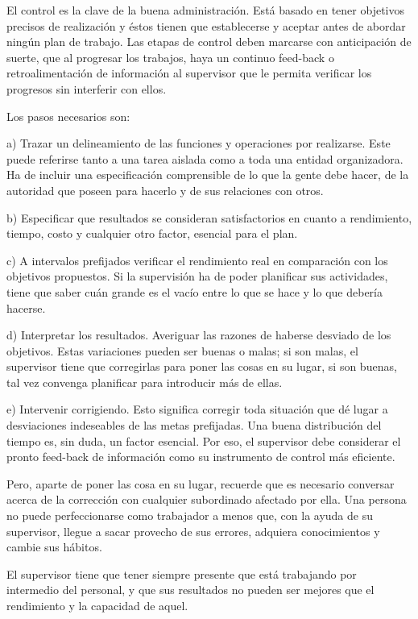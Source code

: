 El control es la clave de la buena administración. Está basado en tener objetivos precisos de realización y éstos tienen que establecerse y aceptar antes de abordar ningún plan de trabajo. Las etapas de control deben marcarse con anticipación de suerte, que al progresar los trabajos, haya un continuo feed-back o retroalimentación de información al supervisor que le permita verificar los progresos sin interferir con ellos.

Los pasos necesarios son:

a) Trazar un delineamiento de las funciones y operaciones por realizarse. Este puede referirse tanto a una tarea aislada como a toda una entidad organizadora. Ha de incluir una especificación comprensible de lo que la gente debe hacer, de la autoridad que poseen para hacerlo y de sus relaciones con otros.

b) Especificar que resultados se consideran satisfactorios en cuanto a rendimiento, tiempo, costo y cualquier otro factor, esencial para el plan.



c) A intervalos prefijados verificar el rendimiento real en comparación con los objetivos propuestos. Si la supervisión ha de poder planificar sus actividades, tiene que saber cuán grande es el vacío entre lo que se hace y lo que debería hacerse.

d) Interpretar los resultados. Averiguar las razones de haberse desviado de los objetivos. Estas variaciones pueden ser buenas o malas; si son malas, el supervisor tiene que corregirlas para poner las cosas en su lugar, si son buenas, tal vez convenga planificar para introducir más de ellas.

e) Intervenir corrigiendo. Esto significa corregir toda situación que dé lugar a desviaciones indeseables de las metas prefijadas. Una buena distribución del tiempo es, sin duda, un factor esencial. Por eso, el supervisor debe considerar el pronto feed-back de información como su instrumento de control más eficiente.

Pero, aparte de poner las cosa en su lugar, recuerde que es necesario conversar acerca de la corrección con cualquier subordinado afectado por ella. Una persona no puede perfeccionarse como trabajador a menos que, con la ayuda de su supervisor, llegue a sacar provecho de sus errores, adquiera conocimientos y cambie sus hábitos.

El supervisor tiene que tener siempre presente que está trabajando por intermedio del personal, y que sus resultados no pueden ser mejores que el rendimiento y la capacidad de aquel.

